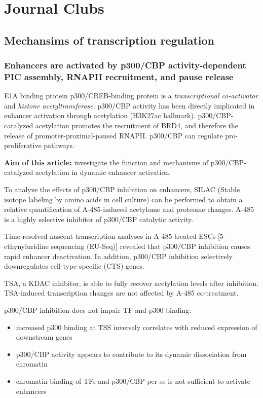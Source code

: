 \graphicspath{{chapters/_resources/}}

\chapter{Journal Clubs}

\section{Mechansims of transcription regulation}
\subsection{Enhancers are activated by p300/CBP activity-dependent PIC assembly, RNAPII recruitment, and pause release}

E1A binding protein p300/CREB-binding protein is a \emph{transcriptional co-activator} and \emph{histone acetyltransferase}. p300/CBP activity has been directly implicated in enhancer activation through acetylation (H3K27ac hallmark). p300/CBP-catalyzed acetylation promotes the recruitment of BRD4, and therefore the release of promoter-proximal-paused RNAPII. p300/CBP can regulate pro-proliferative pathways.

\textbf{Aim of this article:} investigate the function and mechanisms of p300/CBP-catalyzed acetylation in dynamic enhancer activation.

To analyze the effects of p300/CBP inhibition on enhancers, SILAC (Stable isotope labeling by amino acids in cell culture) can be performed to obtain a relative quantification of A-485-induced acetylome and proteome changes. A-485 is a highly selective inhibitor of p300/CBP catalytic activity. 

Time-resolved nascent transcription analyses in A-485-treated ESCs [5-ethynyluridine sequencing (EU-Seq)] revealed that p300/CBP inhibition causes rapid enhancer deactivation. In addition, p300/CBP inhibition selectively downregulates cell-type-specific (CTS) genes.

TSA, a KDAC inhibitor, is able to fully recover acetylation levels after inhibition. TSA-induced transcription changes are not affected by A-485 co-treatment.

p300/CBP inhibition does not impair TF and p300 binding:
\begin{itemize}
\tightlist
\item increased p300 binding at TSS inversely correlates with reduced expression of downstream genes
\item p300/CBP activity appears to contribute to its dynamic dissociation from chromatin
\item chromatin binding of TFs and p300/CBP per se is not sufficient to activate enhancers
\end{itemize}

